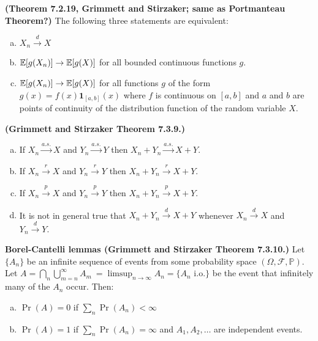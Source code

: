 \begin{theorem}\textbf{(Theorem 7.2.19, Grimmett and Stirzaker; same as Portmanteau Theorem?)} The following three statements are equivalent:

\begin{enumerate}[(a)]

\item \(X_n \xrightarrow{d} X\)

\item \(\mathbb{E}[g(X_n)] \to \mathbb{E}[g(X)]\) for all bounded continuous functions \(g\).

\item \(\mathbb{E}[g(X_n)] \to \mathbb{E}[g(X)]\) for all functions \(g\) of the form \(g(x) = f(x) \boldsymbol{1}_{[a, b]}(x)\) where \(f\) is continuous on \([a, b]\) and \(a\) and \(b\) are points of continuity of the distribution function of the random variable \(X\). 

\end{enumerate}
\end{theorem}

\begin{theorem}\textbf{(Grimmett and Stirzaker Theorem 7.3.9.)} 
\begin{enumerate}[(a)]

\item If \(X_n \xrightarrow{a.s.} X\) and \(Y_n \xrightarrow{a.s.} Y\) then \(X_n + Y_n \xrightarrow{a.s.} X + Y\).

\item If \(X_n \xrightarrow{r} X\) and \(Y_n \xrightarrow{r} Y\) then \(X_n + Y_n \xrightarrow{r} X + Y\).

\item If \(X_n \xrightarrow{p} X\) and \(Y_n \xrightarrow{p} Y\) then \(X_n + Y_n \xrightarrow{p} X + Y\).

\item It is not in general true that  \(X_n + Y_n \xrightarrow{d} X + Y\) whenever  \(X_n \xrightarrow{d} X\) and \(Y_n \xrightarrow{d} Y\).

\end{enumerate}
\end{theorem}

\begin{theorem}\textbf{Borel-Cantelli lemmas (Grimmett and Stirzaker Theorem 7.3.10.)} \label{asym.borel} Let \(\{A_n\}\) be an infinite sequence of events from some probability space \((\Omega, \mathcal{F}, \mathbb{P})\). Let \(A = \bigcap_n \bigcup_{m=n}^\infty A_m\ = \limsup_{n \to \infty} A_n = \{A_n \text{ i.o.}\}\) be the event that infinitely many of the \(A_n\) occur. Then:

\begin{enumerate}[(a)]

\item \(\Pr(A) = 0 \) if \(\sum_n \Pr(A_n) < \infty\)

\item \(\Pr(A) = 1\) if \(\sum_n \Pr(A_n) = \infty\) and \(A_1, A_2, \ldots\) are independent events.

\end{enumerate}
\end{theorem}

